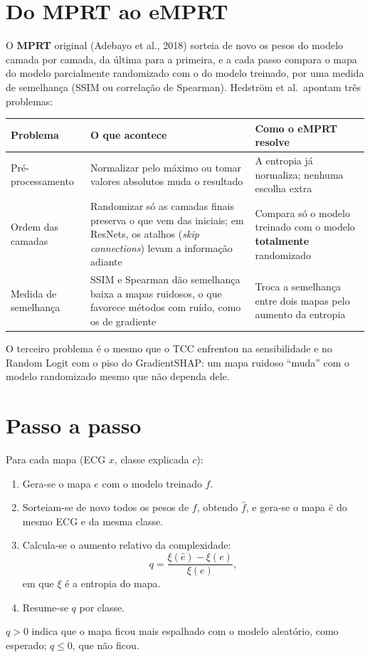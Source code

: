 \documentclass[11pt,a4paper]{article}
\begin{document}
\section{Do MPRT ao eMPRT}
O \textbf{MPRT} original (Adebayo et al., 2018) sorteia de novo os pesos do modelo camada por camada, da última para a primeira, e a cada passo compara o mapa do modelo parcialmente randomizado com o do modelo treinado, por uma medida de semelhança (SSIM ou correlação de Spearman). Hedström et al.\ apontam três problemas:
\begin{center}\small
\begin{tabularx}{\linewidth}{lXX}
\toprule
\textbf{Problema} & \textbf{O que acontece} & \textbf{Como o eMPRT resolve} \\
\midrule
Pré-processamento & Normalizar pelo máximo ou tomar valores absolutos muda o resultado & A entropia já normaliza; nenhuma escolha extra \\ \addlinespace
Ordem das camadas & Randomizar só as camadas finais preserva o que vem das iniciais; em ResNets, os atalhos (\textit{skip connections}) levam a informação adiante & Compara só o modelo treinado com o modelo \textbf{totalmente} randomizado \\ \addlinespace
Medida de semelhança & SSIM e Spearman dão semelhança baixa a mapas ruidosos, o que favorece métodos com ruído, como os de gradiente & Troca a semelhança entre dois mapas pelo aumento da entropia \\
\bottomrule
\end{tabularx}
\end{center}
O terceiro problema é o mesmo que o TCC enfrentou na sensibilidade e no Random Logit com o piso do GradientSHAP: um mapa ruidoso “muda” com o modelo randomizado mesmo que não dependa dele.

\section{Passo a passo}
Para cada mapa (ECG $x$, classe explicada $c$):
\begin{enumerate}
\item Gera-se o mapa $e$ com o modelo treinado $f$.
\item Sorteiam-se de novo todos os pesos de $f$, obtendo $\hat{f}$, e gera-se o mapa $\hat{e}$ do mesmo ECG e da mesma classe.
\item Calcula-se o aumento relativo da complexidade:
\[
q = \frac{\xi(\hat{e}) - \xi(e)}{\xi(e)},
\]
em que $\xi$ é a entropia do mapa.
\item Resume-se $q$ por classe.
\end{enumerate}
$q > 0$ indica que o mapa ficou mais espalhado com o modelo aleatório, como esperado; $q \le 0$, que não ficou.
\end{document}
